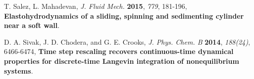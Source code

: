 \documentclass[fleqn,10pt]{InternshipReport_SI-ENS-PSL}
\begin{document}











\begin{thebibliography}{99} %

T. Salez, L. Mahadevan, {\it J. Fluid Mech.} {\bf 2015}, {\it 779}, 181-196, {\bf Elastohydrodynamics of a sliding, spinning and sedimenting cylinder near a soft wall}.

D. A. Sivak, J. D. Chodera, and G. E. Crooks, {\it J. Phys. Chem. B} {\bf 2014}, {\it 188(24)}, 6466-6474, {\bf Time step rescaling recovers continuous-time dynamical properties for discrete-time Langevin integration of nonequilibrium systems}.


\end{thebibliography}
\end{document}
